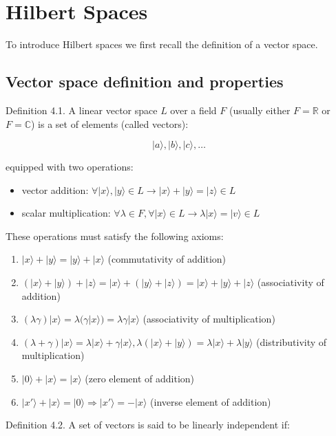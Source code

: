 \chapter{Hilbert Spaces}

To introduce Hilbert spaces we first recall the definition of a vector space.

\section{Vector space definition and properties}

Definition 4.1. A linear vector space $L$ over a field $F$ (usually either $F=\mathbb{R}$ or $F=\mathbb{C}$) is a set of elements (called vectors):

\begin{equation}
|a\rangle, |b\rangle, |c\rangle, \ldots
\end{equation}

equipped with two operations:
\begin{itemize}
  \item vector addition: $\forall|x\rangle,|y\rangle \in L \longrightarrow |x\rangle+|y\rangle=|z\rangle \in L$
  \item scalar multiplication: $\forall \lambda \in F, \forall|x\rangle \in L \longrightarrow \lambda|x\rangle=|v\rangle \in L$
\end{itemize}

These operations must satisfy the following axioms:
\begin{enumerate}
  \item $|x\rangle+|y\rangle=|y\rangle+|x\rangle$ (commutativity of addition)
  \item $(|x\rangle+|y\rangle)+|z\rangle=|x\rangle+(|y\rangle+|z\rangle)=|x\rangle+|y\rangle+|z\rangle$ (associativity of addition)
  \item $(\lambda\gamma)|x\rangle=\lambda(\gamma|x\rangle)=\lambda\gamma|x\rangle$ (associativity of multiplication)
  \item $(\lambda+\gamma)|x\rangle=\lambda|x\rangle+\gamma|x\rangle, \lambda(|x\rangle+|y\rangle)=\lambda|x\rangle+\lambda|y\rangle$ (distributivity of multiplication)
  \item $|0\rangle+|x\rangle=|x\rangle$ (zero element of addition)
  \item $|x'\rangle+|x\rangle=|0\rangle \Longrightarrow |x'\rangle=-|x\rangle$ (inverse element of addition)
\end{enumerate}

Definition 4.2. A set of vectors is said to be linearly independent if:


